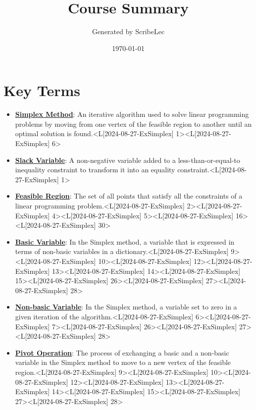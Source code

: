 \documentclass{article}%
\title{Course Summary}%
\author{Generated by ScribeLec}%
\date{\today}%
\begin{document}
%
\normalsize%
\maketitle%
\tableofcontents\newpage%
\section{Key Terms}%
\label{sec:KeyTerms}%
\begin{itemize}[[leftmargin=*]]%
\item \href{https://www.math.purdue.edu/~yipn/421/2024-08-27-ExSimplex.pdf#page=1}{\textbf{Simplex Method}}: An iterative algorithm used to solve linear programming problems by moving from one vertex of the feasible region to another until an optimal solution is found.<L[2024-08-27-ExSimplex] 1><L[2024-08-27-ExSimplex] 6>%
\item \href{https://www.math.purdue.edu/~yipn/421/2024-08-27-ExSimplex.pdf#page=1}{\textbf{Slack Variable}}: A non-negative variable added to a less-than-or-equal-to inequality constraint to transform it into an equality constraint.<L[2024-08-27-ExSimplex] 1>%
\item \href{https://www.math.purdue.edu/~yipn/421/2024-08-27-ExSimplex.pdf#page=2}{\textbf{Feasible Region}}: The set of all points that satisfy all the constraints of a linear programming problem.<L[2024-08-27-ExSimplex] 2><L[2024-08-27-ExSimplex] 4><L[2024-08-27-ExSimplex] 5><L[2024-08-27-ExSimplex] 16><L[2024-08-27-ExSimplex] 30>%
\item \href{https://www.math.purdue.edu/~yipn/421/2024-08-27-ExSimplex.pdf#page=9}{\textbf{Basic Variable}}: In the Simplex method, a variable that is expressed in terms of non-basic variables in a dictionary.<L[2024-08-27-ExSimplex] 9><L[2024-08-27-ExSimplex] 10><L[2024-08-27-ExSimplex] 12><L[2024-08-27-ExSimplex] 13><L[2024-08-27-ExSimplex] 14><L[2024-08-27-ExSimplex] 15><L[2024-08-27-ExSimplex] 26><L[2024-08-27-ExSimplex] 27><L[2024-08-27-ExSimplex] 28>%
\item \href{https://www.math.purdue.edu/~yipn/421/2024-08-27-ExSimplex.pdf#page=6}{\textbf{Non{-}basic Variable}}: In the Simplex method, a variable set to zero in a given iteration of the algorithm.<L[2024-08-27-ExSimplex] 6><L[2024-08-27-ExSimplex] 7><L[2024-08-27-ExSimplex] 26><L[2024-08-27-ExSimplex] 27><L[2024-08-27-ExSimplex] 28>%
\item \href{https://www.math.purdue.edu/~yipn/421/2024-08-27-ExSimplex.pdf#page=9}{\textbf{Pivot Operation}}: The process of exchanging a basic and a non-basic variable in the Simplex method to move to a new vertex of the feasible region.<L[2024-08-27-ExSimplex] 9><L[2024-08-27-ExSimplex] 10><L[2024-08-27-ExSimplex] 12><L[2024-08-27-ExSimplex] 13><L[2024-08-27-ExSimplex] 14><L[2024-08-27-ExSimplex] 15><L[2024-08-27-ExSimplex] 27><L[2024-08-27-ExSimplex] 28>%

\end{itemize}
\end{document}
